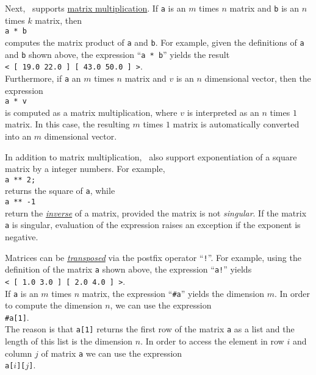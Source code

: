 Next,
\setlx\ supports \href{http://en.wikipedia.org/wiki/Matrix_multiplication}{matrix multiplication}.
If \texttt{a} is an $m$ times $n$ matrix and \texttt{b} is an $n$ times $k$ matrix, then
\\[0.2cm]
\hspace*{1.3cm}
\texttt{a * b}
\\[0.2cm]
computes the matrix product of \texttt{a} and \texttt{b}.  For example, given the definitions of
\texttt{a} and \texttt{b} shown above,  the expression ``\texttt{a * b}'' yields the result
\\[0.2cm]
\hspace*{1.3cm}
\texttt{< [ 19.0  22.0 ]  [ 43.0  50.0 ] >}.
\\[0.2cm]
Furthermore, if \texttt{a}  an $m$ times
$n$ matrix and $v$ is an $n$ dimensional vector, then the expression
\\[0.2cm]
\hspace*{1.3cm}
\texttt{a * v}
\\[0.2cm]
is computed as a matrix multiplication, where $v$ is interpreted as an $n$ times $1$ matrix.  In
this case, the resulting $m$ times $1$ matrix is automatically converted into an $m$ dimensional vector.

In addition to matrix multiplication, \setlx\ also support exponentiation of a square matrix by a
integer numbers.  For example, 
\\[0.2cm]
\hspace*{1.3cm}
\texttt{a ** 2;}
\\[0.2cm]
returns the square  of \texttt{a}, while 
\\[0.2cm]
\hspace*{1.3cm}
\texttt{a ** -1}
\\[0.2cm]
return the \href{http://en.wikipedia.org/wiki/Invertible_matrix}{\emph{inverse}} of a matrix,
provided the matrix is not \emph{singular}.  If the matrix \texttt{a} is singular, evaluation of the
expression raises an exception if the exponent is negative.

Matrices can be \href{http://en.wikipedia.org/wiki/Transpose}{\emph{transposed}} via the postfix
operator ``\texttt{!}''.  For example, using the definition of the matrix \texttt{a} shown above,
the expression ``\texttt{a!}'' yields 
\\[0.2cm]
\hspace*{1.3cm}
\texttt{< [ 1.0  3.0 ]  [ 2.0  4.0 ] >}.
\\[0.2cm]
If \texttt{a} is an $m$ times $n$ matrix, the expression ``\texttt{\#a}'' yields the dimension $m$.  
In order to compute the dimension $n$, we can use the expression 
\\[0.2cm]
\hspace*{1.3cm}
\texttt{\#a[1]}.
\\[0.2cm]
The reason is that \texttt{a[1]} returns the first row of the matrix \texttt{a} as a list and the
length of this list is the dimension $n$.  In order to access the element in row $i$ and column $j$
of matrix \texttt{a} we can use the expression
\\[0.2cm]
\hspace*{1.3cm}
\texttt{a[$i$][$j$]}.

